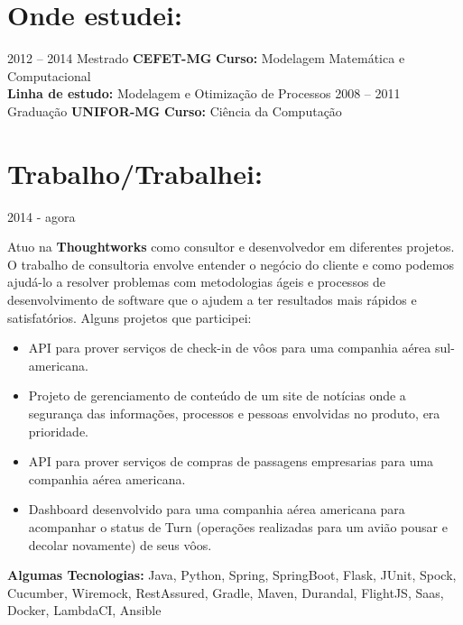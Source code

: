 \documentclass[]{friggeri-cv}
\begin{document}
\section{Onde estudei:}

\begin{entrylist}
  \entry
    {2012 – 2014}
    {Mestrado}
    {\textbf{CEFET-MG}}
    {\textbf{Curso:} Modelagem Matemática e Computacional\\ \textbf{Linha de estudo:} Modelagem e Otimização de Processos}
  \entry
    {2008 – 2011}
    {Graduação}
    {\textbf{UNIFOR-MG}}
    {\textbf{Curso:} Ciência da Computação}  
\end{entrylist}

\section{Trabalho/Trabalhei:}
\begin{entrylist}
  \entry
    {2014 - agora}
    {{\normalfont Atuo na \textbf{Thoughtworks} como consultor e desenvolvedor em diferentes projetos. O trabalho de consultoria envolve entender o negócio do cliente e como podemos ajudá-lo a resolver problemas com metodologias ágeis e processos de desenvolvimento de software que o ajudem a ter resultados mais rápidos e satisfatórios. Alguns projetos que participei:\\
    \begin{itemize}  
\item API para prover serviços de check-in de vôos para uma companhia aérea sul-americana.\\
\item Projeto de gerenciamento de conteúdo de um site de notícias onde a segurança das informações, processos e pessoas envolvidas no produto, era prioridade.\\
\item API para prover serviços de compras de passagens empresarias para uma companhia aérea americana.\\
\item Dashboard desenvolvido para uma companhia aérea americana para acompanhar o status de Turn (operações realizadas para um avião pousar e decolar novamente) de seus vôos.\\
\end{itemize}
\textbf{Algumas Tecnologias:} Java, Python, Spring, SpringBoot, Flask, JUnit, Spock, Cucumber, Wiremock, RestAssured, Gradle, Maven, Durandal, FlightJS, Saas, Docker, LambdaCI, Ansible
    }}{}{}
\end{entrylist}
\end{document}
